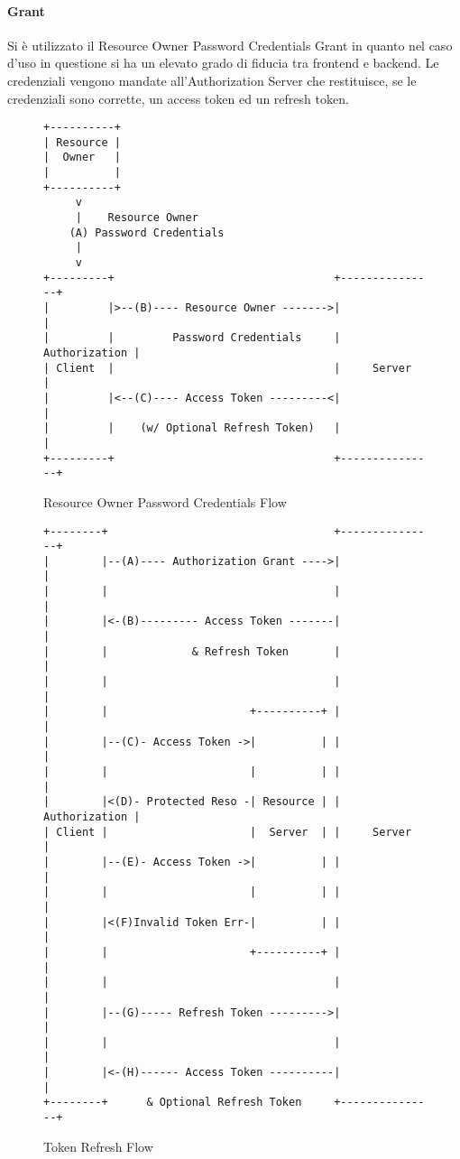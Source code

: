 \paragraph{Grant}
Si è utilizzato il Resource Owner Password Credentials Grant \cite{GRANT} in quanto nel caso d'uso in questione si ha un elevato grado di fiducia tra frontend e backend.
Le credenziali vengono mandate all'Authorization Server che restituisce, se le credenziali sono corrette, un access token ed un refresh token.\\
\begin{figure}[h]
\begin{center}
\label{fig:grantflow}
\begin{verbatim}
+----------+
| Resource |
|  Owner   |
|          |
+----------+
     v
     |    Resource Owner
    (A) Password Credentials
     |
     v
+---------+                                  +---------------+
|         |>--(B)---- Resource Owner ------->|               |
|         |         Password Credentials     | Authorization |
| Client  |                                  |     Server    |
|         |<--(C)---- Access Token ---------<|               |
|         |    (w/ Optional Refresh Token)   |               |
+---------+                                  +---------------+

\end{verbatim}
\caption{Resource Owner Password Credentials Flow \cite{GRANT}}
\end{center}
\end{figure}
\FloatBarrier
\begin{figure}[h]
\begin{center}
\label{fig:refreshflow}
\begin{verbatim}
+--------+                                   +---------------+
|        |--(A)---- Authorization Grant ---->|               |
|        |                                   |               |
|        |<-(B)--------- Access Token -------|               |
|        |             & Refresh Token       |               |
|        |                                   |               |
|        |                      +----------+ |               |
|        |--(C)- Access Token ->|          | |               |
|        |                      |          | |               |
|        |<(D)- Protected Reso -| Resource | | Authorization |
| Client |                      |  Server  | |     Server    |
|        |--(E)- Access Token ->|          | |               |
|        |                      |          | |               |
|        |<(F)Invalid Token Err-|          | |               |
|        |                      +----------+ |               |
|        |                                   |               |
|        |--(G)----- Refresh Token --------->|               |
|        |                                   |               |
|        |<-(H)------ Access Token ----------|               |
+--------+      & Optional Refresh Token     +---------------+

\end{verbatim}
\caption{Token Refresh Flow \cite{REFRESH}}
\end{center}
\end{figure}
